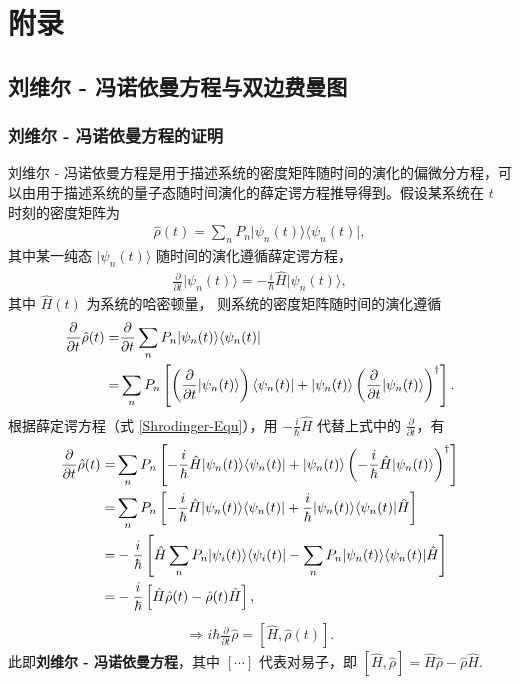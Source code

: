 \documentclass{thesis}
\begin{document}
\chapter{附录}
\section{刘维尔 - 冯诺依曼方程与双边费曼图}
\subsection{刘维尔 - 冯诺依曼方程的证明}
刘维尔 - 冯诺依曼方程是用于描述系统的密度矩阵随时间的演化的偏微分方程，可以由用于描述系统的量子态随时间演化的薛定谔方程推导得到。假设某系统在 $t$ 时刻的密度矩阵为
\begin{align}
    \hat{\rho}(t)=\sum_nP_n\lvert\psi_n(t)\rangle\langle\psi_n(t)\rvert,
\end{align}
其中某一纯态 $\lvert\psi_n(t)\rangle$ 随时间的演化遵循薛定谔方程，
\begin{align}
    \label{Shrodinger-Equ}
    \frac{\partial}{\partial t}\lvert\psi_n(t)\rangle=-\frac{i}{\hbar}\hat{H}\lvert\psi_n(t)\rangle,
\end{align}
其中 $\hat{H}(t)$ 为系统的哈密顿量，
则系统的密度矩阵随时间的演化遵循
\begin{align}
    \notag\frac{\partial}{\partial t}\hat{\rho}(t)=&\frac{\partial}{\partial t}\sum_nP_n\lvert\psi_n(t)\rangle\langle\psi_n(t)\rvert\\
    =&\sum_nP_n\left[\left(\frac{\partial}{\partial t}\lvert\psi_n(t)\rangle\right)\langle\psi_n(t)\rvert+\lvert\psi_n(t)\rangle\left(\frac{\partial}{\partial t}\lvert\psi_n(t)\rangle\right)^{\dagger}\right].
\end{align}
根据薛定谔方程（式 \eqref{Shrodinger-Equ}），用 $-\frac{i}{\hbar}\hat{H}$ 代替上式中的 $\frac{\partial}{\partial t}$，有
\begin{align}
    \notag\frac{\partial}{\partial t}\hat{\rho}(t)=&\sum_nP_n\left[-\frac{i}{\hbar}\hat{H}\lvert\psi_n(t)\rangle\langle\psi_n(t)\rvert+\lvert\psi_n(t)\rangle\left(-\frac{i}{\hbar}\hat{H}\lvert\psi_n(t)\rangle\right)^{\dagger}\right]\\
    \notag=&\sum_nP_n\left[-\frac{i}{\hbar}\hat{H}\lvert\psi_n(t)\rangle\langle\psi_n(t)\rvert+\frac{i}{\hbar}\lvert\psi_n(t)\rangle\langle\psi_n(t)\rvert\hat{H}\right]\\
    \notag=&-\frac{i}{\hbar}\left[\hat{H}\sum_nP_n\lvert\psi_i(t)\rangle\langle\psi_i(t)\rvert-\sum_nP_n\lvert\psi_n(t)\rangle\langle\psi_n(t)\rvert\hat{H}\right]\\
    =&-\frac{i}{\hbar}\left[\hat{H}\hat{\rho}(t)-\hat{\rho}(t)\hat{H}\right],
\end{align}
\begin{gather}
    \label{von Neumann Equ}
    \Longrightarrow i\hbar\frac{\partial}{\partial t}\hat{\rho}=[\hat{H},\hat{\rho}(t)].
\end{gather}
此即\textbf{刘维尔 - 冯诺依曼方程}，其中 $[\cdots]$ 代表对易子，即 $[\hat{H},\hat{\rho}]=\hat{H}\hat{\rho}-\hat{\rho}\hat{H}$.
\end{document}
